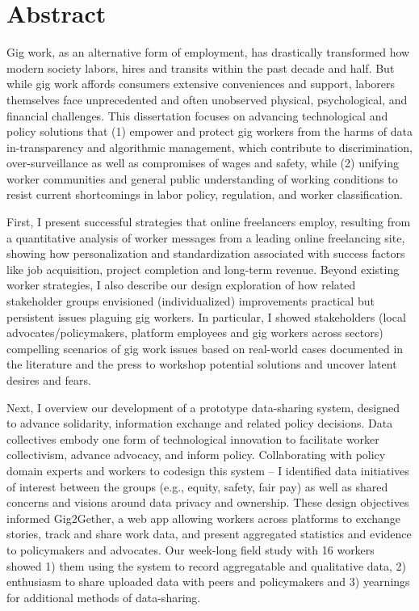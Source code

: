 \begingroup
\let\clearpage\relax
\let\cleardoublepage\relax
\let\cleardoublepage\relax

\chapter*{Abstract}
Gig work, as an alternative form of employment, has drastically transformed how modern society labors, hires and transits within the past decade and half. But while gig work affords consumers extensive conveniences and support,
laborers themselves face unprecedented and often unobserved physical, psychological, and financial challenges. 
This dissertation focuses on advancing technological and policy solutions that (1) empower and protect gig workers from the harms of data in-transparency and algorithmic management, which contribute to discrimination, over-surveillance as well as compromises of wages and safety, while (2) unifying worker communities and general public understanding of working conditions to resist current shortcomings in labor policy, regulation, and worker classification. 

First, I present successful strategies that online freelancers employ, resulting from a quantitative analysis of worker messages from a leading online freelancing site, showing how personalization and standardization associated with success factors like job acquisition, project completion and long-term revenue. Beyond existing worker strategies, I also describe our design exploration of how related stakeholder groups envisioned (individualized) improvements practical but persistent issues plaguing gig workers. In particular, I showed stakeholders (local advocates/policymakers, platform employees and gig workers across sectors) compelling scenarios of gig work issues based on real-world cases documented in the literature and the press to workshop potential solutions and uncover latent desires and fears. 

Next, I overview our development of a prototype data-sharing system, designed to advance solidarity, information exchange and related policy decisions. Data collectives embody one form of technological innovation to facilitate worker collectivism, advance advocacy, and inform policy. Collaborating with policy domain experts and workers to codesign this system -- I identified data initiatives of interest between the groups (e.g., equity, safety, fair pay) as well as shared concerns and visions around data privacy and ownership. These design objectives informed Gig2Gether, a web app allowing workers across platforms to exchange stories, track and share work data, and present aggregated statistics and evidence to policymakers and advocates. Our week-long field study with 16 workers showed 1) them using the system to record aggregatable and qualitative data, 2) enthusiasm to share uploaded data with peers and policymakers and 3) yearnings for additional methods of data-sharing.

